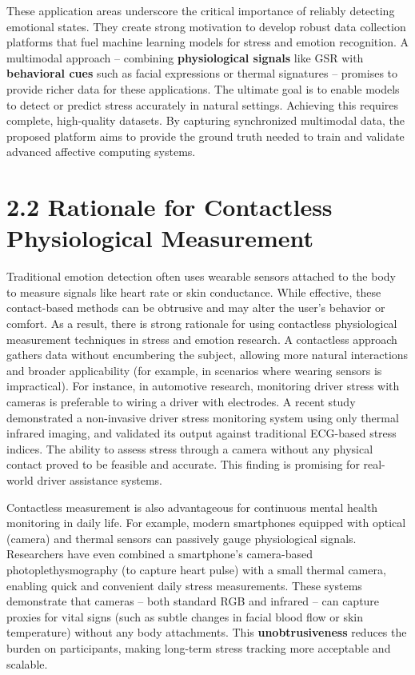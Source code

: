 These application areas underscore the critical importance of reliably detecting emotional states. They create strong motivation to develop robust data collection platforms that fuel machine learning models for stress and emotion recognition. A multimodal approach – combining \textbf{physiological signals} like GSR with \textbf{behavioral cues} such as facial expressions or thermal signatures – promises to provide richer data for these applications. The ultimate goal is to enable models to detect or predict stress accurately in natural settings. Achieving this requires complete, high-quality datasets. By capturing synchronized multimodal data, the proposed platform aims to provide the ground truth needed to train and validate advanced affective computing systems.

\section{2.2 Rationale for Contactless Physiological Measurement}

Traditional emotion detection often uses wearable sensors attached to the body to measure signals like heart rate or skin conductance. While effective, these contact-based methods can be obtrusive and may alter the user's behavior or comfort. As a result, there is strong rationale for using contactless physiological measurement techniques in stress and emotion research. A contactless approach gathers data without encumbering the subject, allowing more natural interactions and broader applicability (for example, in scenarios where wearing sensors is impractical). For instance, in automotive research, monitoring driver stress with cameras is preferable to wiring a driver with electrodes. A recent study demonstrated a non-invasive driver stress monitoring system using only thermal infrared imaging, and validated its output against traditional ECG-based stress indices\cite{DriverStressThermal2020}. The ability to assess stress through a camera without any physical contact proved to be feasible and accurate. This finding is promising for real-world driver assistance systems.

Contactless measurement is also advantageous for continuous mental health monitoring in daily life. For example, modern smartphones equipped with optical (camera) and thermal sensors can passively gauge physiological signals. Researchers have even combined a smartphone's camera-based photoplethysmography (to capture heart pulse) with a small thermal camera, enabling quick and convenient daily stress measurements\cite{GSRFacialThermal2021}. These systems demonstrate that cameras – both standard RGB and infrared – can capture proxies for vital signs (such as subtle changes in facial blood flow or skin temperature) without any body attachments. This \textbf{unobtrusiveness} reduces the burden on participants, making long-term stress tracking more acceptable and scalable.

